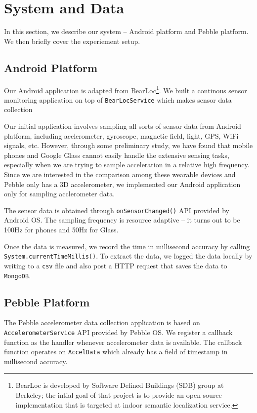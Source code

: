\section{System and Data}
\label{sec:system-data}

In this section, we describe our system -- Android platform and Pebble platform. We then briefly cover the experiement setup.


\subsection{Android Platform}
\label{sec:android-platform}

Our Android application is adapted from BearLoc\footnote{BearLoc is developed by Software Defined Buildings (SDB) group at Berkeley; the intial goal of that project is to provide an open-source implementation that is targeted at indoor semantic localization service.}. We built a continous sensor monitoring application on top of \texttt{BearLocService} which makes sensor data collection

Our initial application involves sampling all sorts of sensor data from Android platform, including acclerometer, gyroscope, magnetic field, light, GPS, WiFi signals, etc. However, through some preliminary study, we have found that mobile phones and Google Glass cannot easily handle the extensive sensing tasks, especially when we are trying to sample acceleration in a relative high frequency. Since we are interested in the comparison among these wearable devices and Pebble only has a 3D accelerometer, we implemented our Android application only for sampling acclerometer data.

The sensor data is obtained through \texttt{onSensorChanged()} API provided by Android OS. The sampling frequency is resource adaptive -- it turns out to be 100Hz for phones and 50Hz for Glass. 

Once the data is measured, we record the time in millisecond accuracy by calling \texttt{System.currentTimeMillis()}. To extract the data, we logged the data locally by writing to a \texttt{csv} file and also post a HTTP request that saves the data to \texttt{MongoDB}.

\subsection{Pebble Platform}
\label{sec:pebble-platform}

The Pebble accelerometer data collection application is based on \texttt{AccelerometerService} API provided by Pebble OS. We register a callback function as the handler whenever accelerometer data is available. The callback function operates on \texttt{AccelData} which already has a field of timestamp in millisecond accuracy. 

